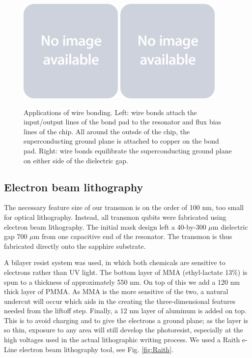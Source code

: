 \documentclass[11 pt, oneside]{book} %
\begin{document}
\begin{figure}[h] 
   \centering
   \includegraphics[width=2in]{placeholder.jpg} \includegraphics[width=2in]{placeholder.jpg} 
   \caption[Applications of wire bonding]{Applications of wire bonding. Left: wire bonds attach the input/output lines of the bond pad to the resonator and flux bias lines of the chip. All around the outsde of the chip, the superconducting ground plane is attached to copper on the bond pad. Right: wire bonds equilibrate the superconducting ground plane on either side of the dielectric gap.}
   \label{fig:Wirebonding}
\end{figure}

\subsection{Electron beam lithography}
The necessary feature size of our transmon is on the order of 100 nm, too small for optical lithography. Instead, all transmon qubits were fabricated using electron beam lithography. The initial mask design left a 40-by-300 $\mu$m dielectric gap 700 $\mu$m from one capacitive end of the resonator. The transmon is thus fabricated directly onto the sapphire substrate. 

A bilayer resist system was used, in which both chemicals are sensitive to electrons rather than UV light. The bottom layer of MMA (ethyl-lactate 13$\%$) is spun to a thickness of approximately 550 nm. On top of this we add a 120 nm thick layer of PMMA. As MMA is the more sensitive of the two, a natural undercut will occur which aids in the creating the three-dimensional features needed from the liftoff step. Finally, a 12 nm layer of aluminum is added on top. This is to avoid charging and to give the electrons a ground plane; as the layer is so thin, exposure to any area will still develop the photoresist, especially at the high voltages used in the actual lithographic writing process. We used a Raith e-Line electron beam lithography tool, see Fig. \ref{fig:Raith}. 
\end{document}
